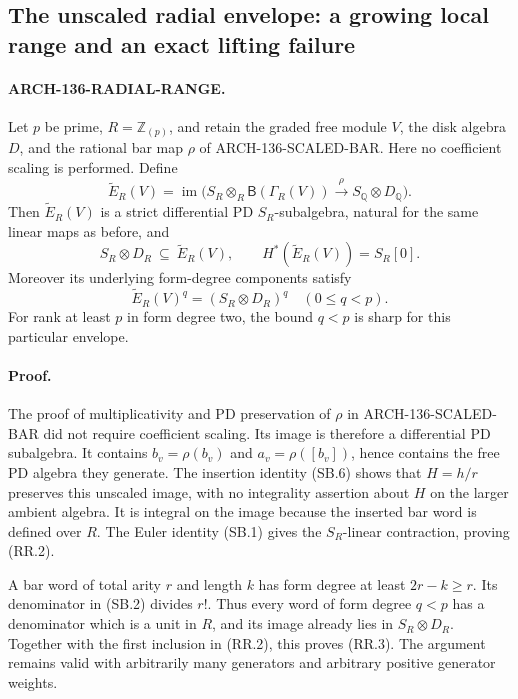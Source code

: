 \subsection{The unscaled radial envelope: a growing local range and an exact lifting failure}
\label{arch136:radial-range}

\paragraph{ARCH-136-RADIAL-RANGE.}
Let \(p\) be prime, \(R=\mathbb Z_{(p)}\), and retain the graded
free module \(V\), the disk algebra \(D\), and the rational bar map
\(\rho\) of ARCH-136-SCALED-BAR. Here no coefficient scaling is
performed. Define
\[
 \widetilde E_R(V)=
 \operatorname{im}\bigl(S_R\otimes_R\mathsf B(\Gamma_R(V))
                  \xrightarrow{\rho}S_{\mathbb Q}\otimes D_{\mathbb Q}\bigr).
 \tag{RR.1}
\]
Then \(\widetilde E_R(V)\) is a strict differential PD
\(S_R\)-subalgebra, natural for the same linear maps as before,
and
\[
 S_R\otimes D_R\ \subseteq\ \widetilde E_R(V),\qquad
 H^*(\widetilde E_R(V))=S_R[0].
 \tag{RR.2}
\]
Moreover its underlying form-degree components satisfy
\[
 \widetilde E_R(V)^q=(S_R\otimes D_R)^q
                         \quad(0\leq q<p).
 \tag{RR.3}
\]
For rank at least \(p\) in form degree two, the bound \(q<p\)
is sharp for this particular envelope.

\paragraph{Proof.}
The proof of multiplicativity and PD preservation of \(\rho\)
in ARCH-136-SCALED-BAR did not require coefficient scaling.
Its image is therefore a differential PD subalgebra. It contains
\(b_v=\rho(b_v)\) and \(a_v=\rho([b_v])\), hence contains the
free PD algebra they generate. The insertion identity (SB.6)
shows that \(H=h/r\) preserves this unscaled image, with no
integrality assertion about \(H\) on the larger ambient algebra.
It is integral on the image because the inserted bar word is
defined over \(R\). The Euler identity (SB.1) gives the
\(S_R\)-linear contraction, proving (RR.2).

A bar word of total arity \(r\) and length \(k\) has form degree
at least \(2r-k\geq r\). Its denominator in (SB.2) divides
\(r!\). Thus every word of form degree \(q<p\) has a denominator
which is a unit in \(R\), and its image already lies in
\(S_R\otimes D_R\). Together with the first inclusion in (RR.2),
this proves (RR.3). The argument remains valid with arbitrarily
many generators and arbitrary positive generator weights.

